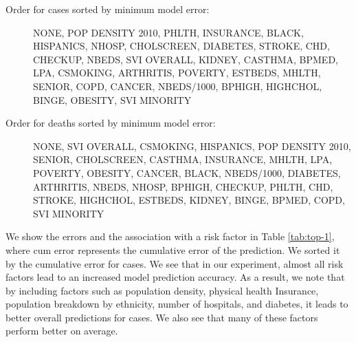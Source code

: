 \documentclass[letterpaper, inpress]{jds} %
\renewcommand{\_}{%
    \textunderscore\hspace{0pt}%
}
\begin{document}
\begin{description}

\item[Order for cases sorted by minimum model error:] NONE,
  POP\_DENSITY\_2010, PHLTH, INSURANCE, BLACK,
  HISPANICS, NHOSP, CHOLSCREEN, DIABETES, STROKE,
  CHD, CHECKUP, NBEDS, SVI\_OVERALL, KIDNEY, CASTHMA, BPMED,
  LPA, CSMOKING, ARTHRITIS, POVERTY, ESTBEDS, MHLTH, SENIOR, COPD,
  CANCER, NBEDS/1000, BPHIGH, HIGHCHOL, BINGE, OBESITY, SVI\_MINORITY

\item[Order for deaths sorted by minimum model error:] NONE,
  SVI\_OVERALL, CSMOKING, HISPANICS, POP\_DENSITY\_2010,
  SENIOR, CHOLSCREEN, CASTHMA, INSURANCE, MHLTH, LPA,
  POVERTY, OBESITY, CANCER, BLACK, NBEDS/1000, DIABETES, ARTHRITIS,
  NBEDS, NHOSP, BPHIGH, CHECKUP, PHLTH, CHD, STROKE, HIGHCHOL,
  ESTBEDS, KIDNEY, BINGE, BPMED, COPD, SVI\_MINORITY
\end{description}

We show the errors and the association with a risk factor in Table
\ref{tab:top-1}, where cum\_error represents the cumulative error of
the prediction. We sorted it by the cumulative error for cases. We see
that in our experiment, almost all risk factors lead to an increased
model prediction accuracy. As a result, we note that by including
factors such as population density, physical health Insurance,
population breakdown by ethnicity, number of hospitals, and diabetes,
it leads to better overall predictions for cases. We also see that
many of these factors perform better on average.
\end{document}
